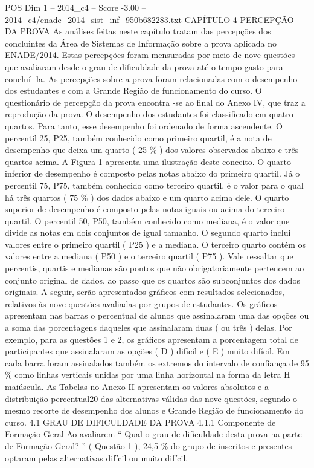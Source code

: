 \begin{textsample}{POS Dim 1 – 2014\_c4 – Score -3.00 – 2014\_c4/enade\_2014\_sist\_inf\_950b682283.txt}  \label{ex:f1_pos_316}
CAPÍTULO 4 PERCEPÇÃO DA PROVA As análises feitas neste capítulo tratam das percepções dos concluintes da Área de Sistemas de Informação sobre a prova aplicada no ENADE/2014.
Estas percepções foram mensuradas por meio de nove questões que avaliaram desde o grau de dificuldade da prova até o tempo gasto para concluí -la.
As percepções sobre a prova foram relacionadas com o desempenho dos estudantes e com a Grande Região de funcionamento do curso.
O questionário de percepção da prova encontra -se ao final do Anexo IV, que traz a reprodução da prova.
O desempenho dos estudantes foi classificado em quatro quartos.
Para tanto, esse desempenho foi ordenado de forma ascendente.
O percentil 25, P25, também conhecido como primeiro quartil, é a nota de desempenho que deixa um quarto ( 25 \% ) dos valores observados abaixo e três quartos acima.
A Figura 1 apresenta uma ilustração deste conceito.
O quarto inferior de desempenho é composto pelas notas abaixo do primeiro quartil.
Já o percentil 75, P75, também conhecido como terceiro quartil, é o valor para o qual há três quartos ( 75 \% ) dos dados abaixo e um quarto acima dele.
O quarto superior de desempenho é composto pelas notas iguais ou acima do terceiro quartil.
O percentil 50, P50, também conhecido como mediana, é o valor que divide as notas em dois conjuntos de igual tamanho.
O segundo quarto inclui valores entre o primeiro quartil ( P25 ) e a mediana.
O terceiro quarto contém os valores entre a mediana ( P50 ) e o terceiro quartil ( P75 ).
Vale ressaltar que percentis, quartis e medianas são pontos que não obrigatoriamente pertencem ao conjunto original de dados, ao passo que os quartos são subconjuntos dos dados originais.
A seguir, serão apresentados gráficos com resultados selecionados, relativos às nove questões avaliadas por grupos de estudantes.
Os gráficos apresentam nas barras o percentual de alunos que assinalaram uma das opções ou a soma das porcentagens daqueles que assinalaram duas ( ou três ) delas.
Por exemplo, para as questões 1 e 2, os gráficos apresentam a porcentagem total de participantes que assinalaram as opções ( D ) difícil e ( E ) muito difícil.
Em cada barra foram assinalados também os extremos do intervalo de confiança de 95 \% como linhas verticais unidas por uma linha horizontal na forma da letra H maiúscula.
As Tabelas no Anexo II apresentam os valores absolutos e a distribuição percentual20 das alternativas válidas das nove questões, segundo o mesmo recorte de desempenho dos alunos e Grande Região de funcionamento do curso. 4.1 GRAU DE DIFICULDADE DA PROVA 4.1.1 Componente de Formação Geral Ao avaliarem “ Qual o grau de dificuldade desta prova na parte de Formação Geral? ” ( Questão 1 ), 24,5 \% do grupo de inscritos e presentes optaram pelas alternativas difícil ou muito difícil.

\end{textsample}

